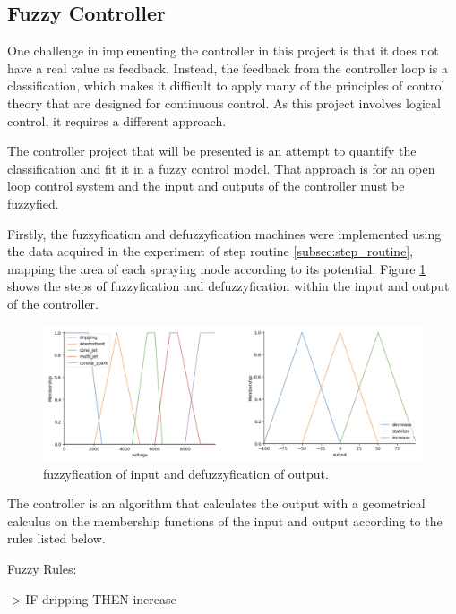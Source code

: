\subsection{Fuzzy Controller}

        One challenge in implementing the controller in this project is that it does not have a real value as feedback. Instead, the feedback from the controller loop is a classification, which makes it difficult to apply many of the principles of control theory that are designed for continuous control. 
        As this project involves logical control, it requires a different approach. 
        
        The controller project that will be presented is an attempt to quantify the classification and fit it in a fuzzy control model.
        That approach is for an open loop control system and the input and outputs of the controller must be fuzzyfied.

        Firstly, the fuzzyfication and defuzzyfication machines were implemented using the data acquired in the experiment of step routine \ref{subsec:step_routine}, mapping the area of each spraying mode according to its potential.
        Figure \ref{fig:fuzzyy} shows the steps of fuzzyfication and defuzzyfication within the input and output of the controller.


            \begin{figure}[H]
                \centering
                \includegraphics[width=17cm]{Figuras/fuzzy/Fuzzyy.png}
                \caption{fuzzyfication of input and defuzzyfication of output.}
                \label{fig:fuzzyy}
            \end{figure}



        The controller is an algorithm that calculates the output with a geometrical calculus on the membership functions of the input and output according to the rules listed below.

        Fuzzy Rules:

        -> IF dripping THEN increase

